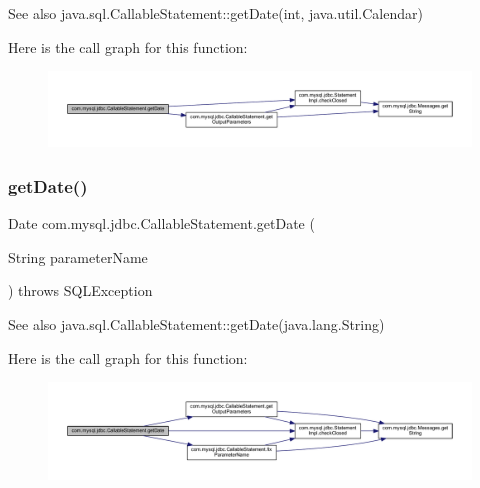 \begin{DoxySeeAlso}{See also}
java.\+sql.\+Callable\+Statement\+::get\+Date(int, java.\+util.\+Calendar) 
\end{DoxySeeAlso}
Here is the call graph for this function\+:\nopagebreak
\begin{figure}[H]
\begin{center}
\leavevmode
\includegraphics[width=350pt]{classcom_1_1mysql_1_1jdbc_1_1_callable_statement_a8ab6fc7be6dedec149de4fa5062c88a3_cgraph}
\end{center}
\end{figure}
\mbox{\label{classcom_1_1mysql_1_1jdbc_1_1_callable_statement_a446e34b8c116c446ad585e8efab08f8d}} 
\subsubsection{\texorpdfstring{get\+Date()}{getDate()}\hspace{0.1cm}{\footnotesize\ttfamily [3/4]}}
{\footnotesize\ttfamily Date com.\+mysql.\+jdbc.\+Callable\+Statement.\+get\+Date (\begin{DoxyParamCaption}\item[{String}]{parameter\+Name }\end{DoxyParamCaption}) throws S\+Q\+L\+Exception}

\begin{DoxySeeAlso}{See also}
java.\+sql.\+Callable\+Statement\+::get\+Date(java.\+lang.\+String) 
\end{DoxySeeAlso}
Here is the call graph for this function\+:\nopagebreak
\begin{figure}[H]
\begin{center}
\leavevmode
\includegraphics[width=350pt]{classcom_1_1mysql_1_1jdbc_1_1_callable_statement_a446e34b8c116c446ad585e8efab08f8d_cgraph}
\end{center}
\end{figure}
\mbox{\label{classcom_1_1mysql_1_1jdbc_1_1_callable_statement_a505f0e9a0a426dd9c71cd0e4a43bd13e}} 
